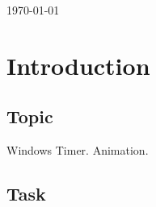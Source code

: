 \documentclass[12pt]{article}
\begin{document}
\begin{titlepage}
\begin{center}
      \vspace{5 mm}


      {\large \today}\\[3cm] %




      \vfill %
      \end{center}
      \end{titlepage}



  \section{Introduction}

  \subsection{Topic}
Windows Timer. Animation.

  \subsection{Task}
\end{document}
